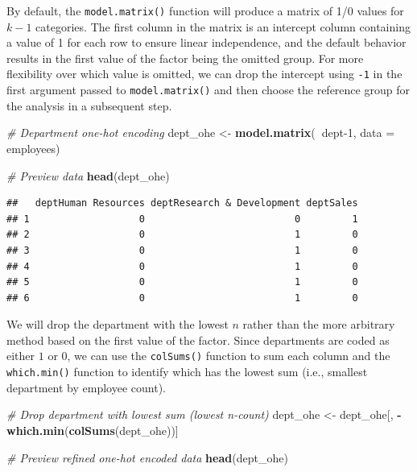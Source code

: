 \documentclass[]{book}
\newenvironment{Shaded}{\begin{snugshade}}{\end{snugshade}}
\newcommand{\CommentTok}[1]{\textcolor[rgb]{0.56,0.35,0.01}{\textit{#1}}}
\newcommand{\DataTypeTok}[1]{\textcolor[rgb]{0.13,0.29,0.53}{#1}}
\newcommand{\DecValTok}[1]{\textcolor[rgb]{0.00,0.00,0.81}{#1}}
\newcommand{\KeywordTok}[1]{\textcolor[rgb]{0.13,0.29,0.53}{\textbf{#1}}}
\newcommand{\NormalTok}[1]{#1}
\newcommand{\OperatorTok}[1]{\textcolor[rgb]{0.81,0.36,0.00}{\textbf{#1}}}
\newcommand{\StringTok}[1]{\textcolor[rgb]{0.31,0.60,0.02}{#1}}
\begin{document}
By default, the \texttt{model.matrix()} function will produce a matrix of 1/0 values for \(k-1\) categories. The first column in the matrix is an intercept column containing a value of 1 for each row to ensure linear independence, and the default behavior results in the first value of the factor being the omitted group. For more flexibility over which value is omitted, we can drop the intercept using \texttt{-1} in the first argument passed to \texttt{model.matrix()} and then choose the reference group for the analysis in a subsequent step.

\begin{Shaded}
\begin{Highlighting}[]
\CommentTok{# Department one-hot encoding}
\NormalTok{dept_ohe <-}\StringTok{ }\KeywordTok{model.matrix}\NormalTok{(}\OperatorTok{~}\NormalTok{dept}\DecValTok{-1}\NormalTok{, }\DataTypeTok{data =}\NormalTok{ employees)}

\CommentTok{# Preview data}
\KeywordTok{head}\NormalTok{(dept_ohe)}
\end{Highlighting}
\end{Shaded}

\begin{verbatim}
##   deptHuman Resources deptResearch & Development deptSales
## 1                   0                          0         1
## 2                   0                          1         0
## 3                   0                          1         0
## 4                   0                          1         0
## 5                   0                          1         0
## 6                   0                          1         0
\end{verbatim}

We will drop the department with the lowest \(n\) rather than the more arbitrary method based on the first value of the factor. Since departments are coded as either \(1\) or \(0\), we can use the \texttt{colSums()} function to sum each column and the \texttt{which.min()} function to identify which has the lowest sum (i.e., smallest department by employee count).

\begin{Shaded}
\begin{Highlighting}[]
\CommentTok{# Drop department with lowest sum (lowest n-count)}
\NormalTok{dept_ohe <-}\StringTok{ }\NormalTok{dept_ohe[, }\OperatorTok{-}\KeywordTok{which.min}\NormalTok{(}\KeywordTok{colSums}\NormalTok{(dept_ohe))]}

\CommentTok{# Preview refined one-hot encoded data}
\KeywordTok{head}\NormalTok{(dept_ohe)}
\end{Highlighting}
\end{Shaded}
\end{document}
